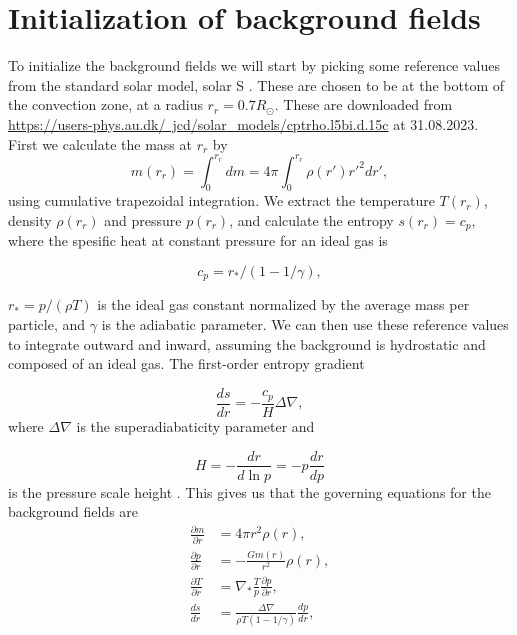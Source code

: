 \documentclass{article}
\begin{document}
\section{Initialization of background fields}
To initialize the background fields we will start by picking some reference values from the standard solar model, solar S \citep{1996Sci...272.1286C}. These are chosen to be at the bottom of the convection zone, at a radius  $r_r=0.7R_{\odot}$. These are downloaded from \href{https://users-phys.au.dk/~jcd/solar_models/cptrho.l5bi.d.15c}{https://users-phys.au.dk/~jcd/solar_models/cptrho.l5bi.d.15c} at 31.08.2023. First we calculate the mass at $r_r$ by
\begin{equation}
    m(r_r)=\int_0^{r_r} dm = 4\pi \int_0^{r_r} \rho(r')r'^2 dr',
\end{equation}
using cumulative trapezoidal integration. We extract the temperature $T(r_r)$, density $\rho(r_r)$ and pressure $p(r_r)$, and calculate the entropy $s(r_r)=c_p$, where the spesific heat at constant pressure for an ideal gas is

\begin{equation*}
    c_p = r_*/(1-1/\gamma),
\end{equation*}

$r_*=p/(\rho T)$ is the ideal gas constant normalized by the average mass per particle, and $\gamma$ is the adiabatic parameter. We can then use these reference values to integrate outward and inward, assuming the background is hydrostatic and composed of an ideal gas. The first-order entropy gradient 

\begin{equation*}
    \frac{ds}{dr} = -\frac{c_p}{H} \Delta\nabla,
\end{equation*}
where $\Delta\nabla$ is the superadiabaticity parameter and

\begin{equation*}
    H = - \frac{dr}{d\ln p} = - p\frac{dr}{dp}
\end{equation*}
is the pressure scale height \citep{1999ApJS..121..247L}. This gives us that the governing equations for the background fields are
\begin{align}
    \frac{\partial m}{\partial r} &= 4\pi r^2\rho(r), \label{eq:dm_dr}\\
    \frac{\partial p}{\partial r} &= -\frac{G m(r)}{r^2}\rho(r), \label{eq:dp_dr}\\
    \frac{\partial T}{\partial r} &= \nabla_{*} \frac{T}{p}\frac{\partial p}{\partial r}, \label{eq:dT_dr}\\
    \frac{ds}{dr} &=\frac{\Delta\nabla}{\rho T (1-1/\gamma)}\frac{dp}{dr}, \label{eq:ds_dr}
\end{align}
\end{document}
